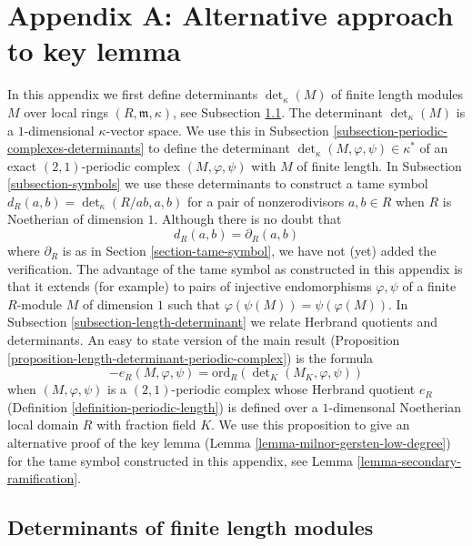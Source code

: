 











\section{Appendix A: Alternative approach to key lemma}
\label{section-appendix-A}

\noindent
In this appendix we first define determinants $\det_\kappa(M)$
of finite length modules $M$ over local rings $(R, \mathfrak m, \kappa)$,
see Subsection \ref{subsection-determinants-finite-length}.
The determinant $\det_\kappa(M)$ is a $1$-dimensional $\kappa$-vector space.
We use this in Subsection \ref{subsection-periodic-complexes-determinants}
to define the determinant $\det_\kappa(M, \varphi, \psi) \in \kappa^*$
of an exact $(2, 1)$-periodic complex $(M, \varphi, \psi)$
with $M$ of finite length. In Subsection \ref{subsection-symbols}
we use these determinants to construct a tame symbol
$d_R(a, b) = \det_\kappa(R/ab, a, b)$ for a pair of nonzerodivisors
$a, b \in R$ when $R$ is Noetherian of dimension $1$.
Although there is no doubt that
$$
d_R(a, b) = \partial_R(a, b)
$$
where $\partial_R$ is as in Section \ref{section-tame-symbol},
we have not (yet) added the verification. The advantage of the
tame symbol as constructed in this appendix is that it extends
(for example) to pairs of injective endomorphisms $\varphi, \psi$
of a finite $R$-module $M$ of dimension $1$ such that
$\varphi(\psi(M)) = \psi(\varphi(M))$. In
Subsection \ref{subsection-length-determinant}
we relate Herbrand quotients and determinants.
An easy to state version of the main result
(Proposition \ref{proposition-length-determinant-periodic-complex})
is the formula
$$
-e_R(M, \varphi, \psi) =
\text{ord}_R(\det\nolimits_K(M_K, \varphi, \psi))
$$
when $(M, \varphi, \psi)$ is a $(2, 1)$-periodic complex
whose Herbrand quotient $e_R$ (Definition \ref{definition-periodic-length})
is defined
over a $1$-dimensonal Noetherian local domain $R$ with fraction field $K$.
We use this proposition to give an alternative proof of the key lemma
(Lemma \ref{lemma-milnor-gersten-low-degree})
for the tame symbol constructed in this appendix, see
Lemma \ref{lemma-secondary-ramification}.


\subsection{Determinants of finite length modules}
\label{subsection-determinants-finite-length}

